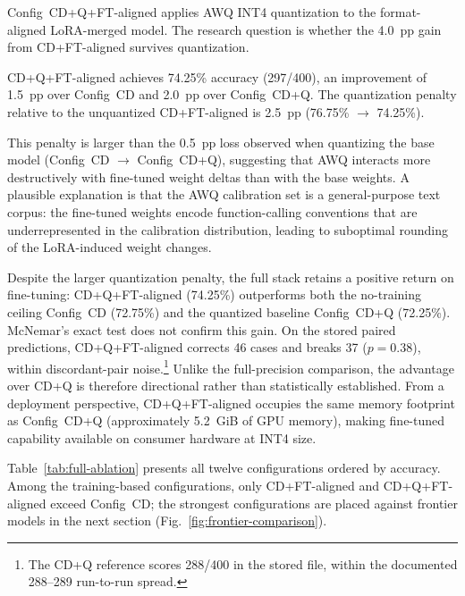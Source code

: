 Config~CD+Q+FT-aligned applies AWQ INT4 quantization to the format-aligned
LoRA-merged model. The research question is whether the 4.0~pp gain from
CD+FT-aligned survives quantization.

CD+Q+FT-aligned achieves 74.25\% accuracy (297/400), an improvement of
1.5~pp over Config~CD and 2.0~pp over Config~CD+Q. The quantization
penalty relative to the unquantized CD+FT-aligned is 2.5~pp (76.75\%
$\to$ 74.25\%).

This penalty is larger than the 0.5~pp loss observed when quantizing the
base model (Config~CD $\to$ Config~CD+Q), suggesting that AWQ interacts
more destructively with fine-tuned weight deltas than with the base
weights. A plausible explanation is that the AWQ calibration set is a
general-purpose text corpus: the fine-tuned weights encode
function-calling conventions that are underrepresented in the calibration
distribution, leading to suboptimal rounding of the LoRA-induced weight
changes.

Despite the larger quantization penalty, the full stack retains a positive
return on fine-tuning: CD+Q+FT-aligned (74.25\%) outperforms both the
no-training ceiling Config~CD (72.75\%) and the quantized baseline
Config~CD+Q (72.25\%). McNemar's exact test does not confirm this gain.
On the stored paired predictions, CD+Q+FT-aligned corrects 46 cases and
breaks 37 ($p = 0.38$), within discordant-pair noise.\footnote{The CD+Q
reference scores 288/400 in the stored file, within the documented
288--289 run-to-run spread.} Unlike the full-precision comparison, the
advantage over CD+Q is therefore directional rather than statistically
established. From a deployment perspective, CD+Q+FT-aligned occupies
the same memory footprint as Config~CD+Q (approximately 5.2~GiB of GPU
memory), making fine-tuned capability available on consumer hardware at
INT4 size.

Table~\ref{tab:full-ablation} presents all twelve configurations ordered
by accuracy. Among the training-based configurations, only CD+FT-aligned
and CD+Q+FT-aligned exceed Config~CD; the strongest configurations are
placed against frontier models in the next section
(Fig.~\ref{fig:frontier-comparison}).

